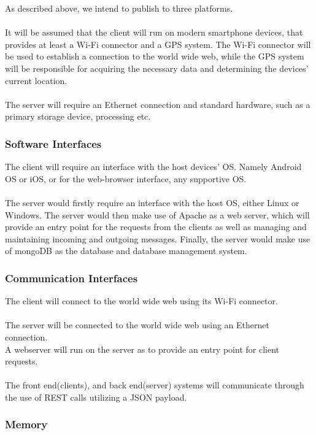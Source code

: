 \documentclass[12pt,a4paper]{article}
\begin{document}
				As described above, we intend to publish to three platforms.\\\\
				It will be assumed that the client will run on modern smartphone devices, 
				that provides at least a Wi-Fi connector and a GPS system. The Wi-Fi 
				connector will be used to establish a connection to the world wide web, 
				while the GPS system will be responsible for acquiring the necessary data 
				and determining the devices' current location.\\\\
				The server will require an Ethernet connection and standard hardware, such 
				as a primary storage device, processing etc.


			\subsubsection{Software Interfaces}

				The client will require an interface with the host devices' OS. Namely Android OS or iOS, 
				or for the web-browser interface, any supportive OS.\\\\
				The server would firstly require an interface with the host OS, either Linux or Windows. 
				The server would then make use of Apache as a web server, which will provide an entry point 
				for the requests from the clients as well as managing and maintaining incoming and outgoing 
				messages. Finally, the server would make use of mongoDB as the database and database 
				management system. 

			\subsubsection{Communication Interfaces}
			
				The client will connect to the world wide web using its Wi-Fi connector. \\\\
				The server will be connected to the world wide web using an Ethernet connection. \\
				A webserver will run on the server as to provide an entry point for client requests.\\\\
				The front end(clients), and back end(server) systems will communicate through the use of 
				REST calls utilizing a JSON payload.  


			\subsubsection{Memory}
\end{document}
